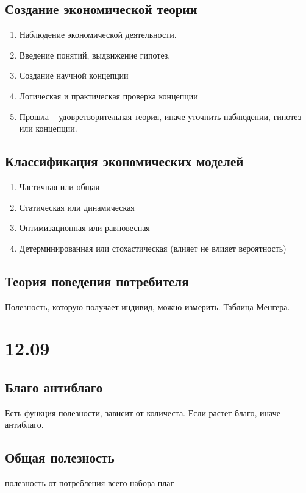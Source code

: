 \documentclass[14pt]{extarticle}
\begin{document}
    \subsection{Создание экономической теории}
    \begin{enumerate}
        \item Наблюдение экономической деятельности.
        \item Введение понятий, выдвижение гипотез.
        \item Создание научной концепции
        \item Логическая и практическая проверка концепции
        \item Прошла -- удовретворительная теория, иначе уточнить наблюдении, гипотез или концепции.
    \end{enumerate}
    \subsection{Классификация экономических моделей}
    \begin{enumerate}
        \item Частичная или общая
        \item Статическая или динамическая
        \item Оптимизационная или равновесная
        \item Детерминированная или стохастическая (влияет не влияет вероятность)
    \end{enumerate}
    \subsection{Теория поведения потребителя}
    Полезность, которую получает индивид, можно измерить.
    Таблица Менгера.
\section{12.09}
\subsection{Благо антиблаго}
Есть функция полезности, зависит от количеста. Если растет благо, иначе антиблаго.
\subsection{Общая полезность}
полезность от потребления всего набора плаг
\end{document}
